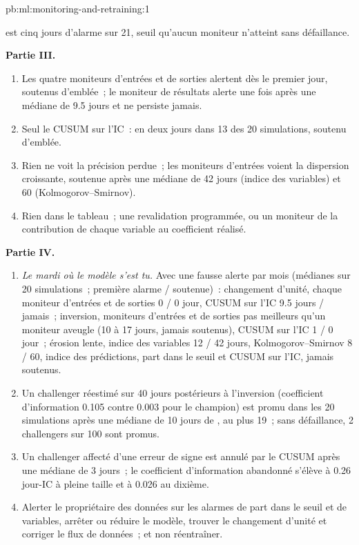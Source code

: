 \begin{solution}{pb:ml:monitoring-and-retraining:1}
\begin{enumerate}[resume]
est cinq jours d'alarme sur 21, seuil qu'aucun moniteur n'atteint sans défaillance.
\end{enumerate}
\textbf{Partie III.}
\begin{enumerate}[resume]
\item Les quatre moniteurs d'entrées et de sorties alertent dès le premier jour, soutenus d'emblée~; le moniteur de résultats alerte une fois après une médiane de
9.5 jours et ne persiste jamais.
\item Seul le CUSUM sur l'IC~: en deux jours dans 13 des 20 simulations, soutenu d'emblée.
\item Rien ne voit la précision perdue~; les moniteurs d'entrées voient la dispersion croissante, soutenue après une médiane de 42 jours (indice des
variables) et 60 (Kolmogorov--Smirnov).
\item Rien dans le tableau~; une revalidation programmée, ou un moniteur de la contribution de chaque variable au coefficient réalisé.
\end{enumerate}
\textbf{Partie IV.}
\begin{enumerate}[resume]
\item \emph{Le mardi où le modèle s'est tu.} Avec une fausse alerte par mois (médianes sur 20 simulations~; première alarme / soutenue)~:
changement d'unité, chaque moniteur d'entrées et de sorties 0 / 0 jour, CUSUM sur l'IC 9.5 jours / jamais~; inversion, moniteurs d'entrées et de sorties pas meilleurs
qu'un moniteur aveugle (10 à 17 jours, jamais soutenus), CUSUM sur l'IC 1 / 0 jour~; érosion lente, indice des variables 12 / 42 jours, Kolmogorov--Smirnov 8 /
60, indice des prédictions, part dans le seuil et CUSUM sur l'IC, jamais soutenus.
\item Un challenger réestimé sur 40 jours postérieurs à l'inversion (coefficient d'information 0.105 contre 0.003 pour le champion) est promu dans
les 20 simulations après une médiane de 10 jours de , au plus 19~; sans défaillance, 2 challengers sur 100 sont promus.
\item Un challenger affecté d'une erreur de signe est annulé par le CUSUM après une médiane de 3 jours~; le coefficient d'information abandonné
s'élève à 0.26 jour-IC à pleine taille et à 0.026 au dixième.
\item Alerter le propriétaire des données sur les alarmes de part dans le seuil et de variables, arrêter ou réduire le modèle, trouver le changement d'unité et corriger le flux de données~;
et non réentraîner.

\end{enumerate}
\end{solution}
